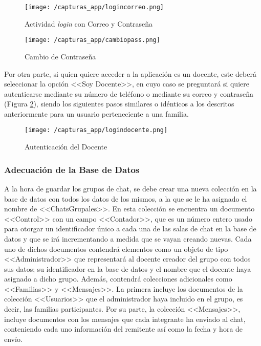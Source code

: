 \begin{figure}[!h]
	\centering
	\begin{minipage}{.5\textwidth}
		\centering
		\texttt{[image: /capturas\_app/logincorreo.png]}
		\caption{Actividad \textit{login} con Correo y Contraseña}
		\label{fig:logincorreo}
	\end{minipage}%
	\begin{minipage}{.5\textwidth}
		\centering
		\texttt{[image: /capturas\_app/cambiopass.png]}
		\caption{Cambio de Contraseña}
		\label{fig:cambiopass}
	\end{minipage}
\end{figure}

\clearpage

Por otra parte, si quien quiere acceder a la aplicación es un docente, este deberá seleccionar la opción <<Soy Docente>>, en cuyo caso se preguntará si quiere autenticarse mediante su número de teléfono o mediante su correo y contraseña (Figura \ref{fig:logindocente}), siendo los siguientes pasos similares o idénticos a los descritos anteriormente para un usuario perteneciente a una familia.

\begin{figure}[!h]
	\begin{center}
		\texttt{[image: /capturas\_app/logindocente.png]}
		\caption{Autenticación del Docente}
		\label{fig:logindocente}
	\end{center}
\end{figure}

\subsubsection{Adecuación de la Base de Datos}
A la hora de guardar los grupos de chat, se debe crear una nueva colección en la base de datos con todos los datos de los mismos, a la que se le ha asignado el nombre de \mbox{<<ChatsGrupales>>}. En esta colección se encuentra un documento <<Control>> con un campo <<Contador>>, que es un número entero usado para otorgar un identificador único a cada una de las salas de chat en la base de datos y que se irá incrementando a medida que se vayan creando nuevas. Cada uno de dichos documentos contendrá elementos como un objeto de tipo <<Administrador>> que representará al docente creador del grupo con todos sus datos; su identificador en la base de datos y el nombre que el docente haya asignado a dicho grupo. Además, contendrá colecciones adicionales como <<Familias>> y <<Mensajes>>. La primera incluye los documentos de la colección <<Usuarios>> que el administrador haya incluido en el grupo, es decir, las familias participantes. Por su parte, la colección <<Mensajes>>, incluye documentos con los mensajes que cada integrante ha enviado al chat, conteniendo cada uno información del remitente así como la fecha y hora de envío.

